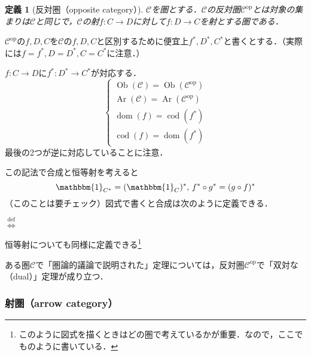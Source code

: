 \documentclass[dvipdfmx,a4j,10pt]{jsarticle}
\theoremstyle{mystyle1}
\theoremstyle{mystyle2}
\newtheorem{dfn*}{定義}
\newcommand{\defLeftrightarrow}{\overset{\text{def}}{\iff}}
\DeclareMathOperator{\Ob}{Ob}
\DeclareMathOperator{\Ar}{Ar}
\DeclareMathOperator{\dom}{dom}
\DeclareMathOperator{\cod}{cod}
\begin{document}
	\begin{dfn*}[反対圏（opposite category）\footnotemark]
		$\mathcal{C}$を圏とする．$\mathcal{C}$の反対圏$\mathcal{C}^{\mathrm{op}}$とは対象の集まりは$\mathcal{C}$と同じで，$\mathcal{C}$の射$f:C\to D$に対して$f:D\to C$を射とする圏である．
	\end{dfn*}

$\mathcal{C}^{\mathrm{op}}$の$f,D,C$を$\mathcal{C}$の$f,D,C$と区別するために便宜上$f^*,D^*,C^*$と書くとする．（実際には$f=f^*,D=D^*,C=C^*$に注意．）

$f:C\to D$に$f^*:D^* \to C^*$が対応する．
\[
	\begin{cases}
		\Ob(\mathcal{C})  =\Ob(\mathcal{C}^{\mathrm{op}}) \\
		\Ar(\mathcal{C})  =\Ar(\mathcal{C}^{\mathrm{op}}) \\
		\dom(f)           =\cod(f^*)                      \\
		\cod(f)           =\dom(f^*)
	\end{cases}
\]
最後の2つが逆に対応していることに注意．

この記法で合成と恒等射を考えると
\[
	\mathbbm{1}_{C^*}=(\mathbbm{1}_C)^*,\, f^*\circ g^*=(g\circ f)^*
\]
（このことは要チェック）図式で書くと合成は次のように定義できる．
\begin{center}
	$\defLeftrightarrow$
\end{center}
恒等射についても同様に定義できる\footnote{このように図式を描くときはどの圏で考えているかが重要．なので，ここでものように書いている．}

ある圏$\mathcal{C}$で「圏論的議論で説明された」定理については，反対圏$\mathcal{C}^{\mathrm{op}}$で「双対な（dual）」定理が成り立つ．

\subsubsection{射圏（arrow category）}
\end{document}
